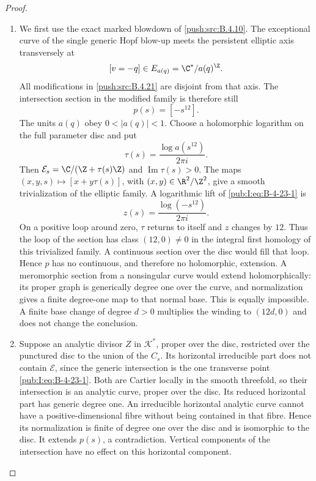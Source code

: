 \begin{proof}
\begin{enumerate}[label=\arabic*.,leftmargin=*]
\item We first use the exact marked blowdown of \ref{push:src:B.4.10}.
The exceptional curve of the single generic Hopf blow-up
meets the persistent elliptic axis transversely at
\[
 [v=-q]\in E_{a(q)}=\C^*/a(q)^{\Z}.
\]
All modifications in \ref{push:src:B.4.21} are disjoint from that axis.
The intersection section in the modified family is therefore
still
\begin{equation}
 p(s)=[-s^{12}].
\label{pub:I:eq:B-4-23-1}
\end{equation}
The units $a(q)$ obey $0<|a(q)|<1$. Choose a holomorphic
logarithm on the full parameter disc and put
\[
 \tau(s)=\frac{\log a(s^{12})}{2\pi i}.
\]
Then $\mathcal E_s=\C/(\Z+\tau(s)\Z)$ and
$\operatorname{Im}\tau(s)>0$. The maps
$(x,y,s)\mapsto[x+y\tau(s)]$, with $(x,y)\in\R^2/\Z^2$,
give a smooth trivialization of the elliptic family.
A logarithmic lift of \eqref{pub:I:eq:B-4-23-1} is
\[
 z(s)=\frac{\log(-s^{12})}{2\pi i}.
\]
On a positive loop around zero, $\tau$ returns to itself
and $z$ changes by $12$. Thus the loop of the section has
class $(12,0)\ne0$ in the integral first homology of this
trivialized family. A continuous section over the disc
would fill that loop. Hence $p$ has no continuous, and
therefore no holomorphic, extension. A meromorphic section
from a nonsingular curve would extend holomorphically:
its proper graph is generically degree one over the curve,
and normalization gives a finite degree-one map to that
normal base. This is equally impossible. A finite base
change of degree $d>0$ multiplies the winding to $(12d,0)$
and does not change the conclusion.

\item Suppose an analytic divisor $Z$ in $\mathcal K^*$, proper
over the disc, restricted over the punctured disc to the
union of the $C_s$. Its horizontal irreducible part does
not contain $\mathcal E$, since the generic intersection
is the one transverse point \eqref{pub:I:eq:B-4-23-1}. Both are Cartier
locally in the smooth threefold, so their intersection
is an analytic curve, proper over the disc. Its reduced
horizontal part has generic degree one. An irreducible
horizontal analytic curve cannot have a positive-dimensional
fibre without being contained in that fibre. Hence its
normalization is finite of degree one over the disc and
is isomorphic to the disc. It extends $p(s)$, a
contradiction. Vertical components of the intersection
have no effect on this horizontal component.


\end{enumerate}
\end{proof}
